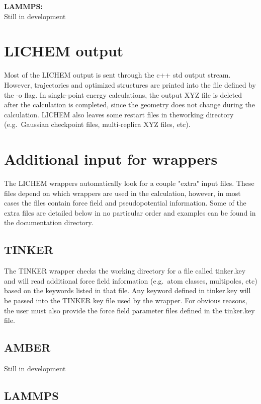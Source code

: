 \documentclass[12pt]{report}
\begin{document}
{\textbf{LAMMPS:}} \\

{\color{red}Still in development}

\section{LICHEM output}

Most of the LICHEM output is sent through the c++ std output stream.
However, trajectories and optimized structures are printed into the file
defined by the -o flag.
In single-point energy calculations, the output XYZ file is deleted after the
calculation is completed, since the geometry does not change during the
calculation.
LICHEM also leaves some restart files in theworking directory (e.g.\ Gaussian
checkpoint files, multi-replica XYZ files, etc).

\section{Additional input for wrappers}

The LICHEM wrappers automatically look for a couple "extra" input files.
These files depend on which wrappers are used in the calculation, however, in
most cases the files contain force field and pseudopotential information.
Some of the extra files are detailed below in no particular order and examples
can be found in the documentation directory.

\subsection{TINKER}

The TINKER wrapper checks the working directory for a file called tinker.key
and will read additional force field information (e.g.\ atom classes,
multipoles, etc) based on the keywords listed in that file.
Any keyword defined in tinker.key will be passed into the TINKER key file used
by the wrapper.
For obvious reasons, the user must also provide the force field parameter
files defined in the tinker.key file.

\subsection{AMBER}

{\color{red}Still in development}

\subsection{LAMMPS}
\end{document}
